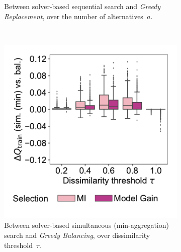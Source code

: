 \documentclass{article}
\theoremstyle{definition}
\begin{document}
\begin{figure}[p]
\begin{subfigure}[t]{0.48\textwidth}
		\caption{
			Between solver-based sequential search and \emph{Greedy Replacement}, over the number of alternatives~$a$.
		}
		\label{fig:afs:impact-search-heuristics-metric-diff-seq-num-alternatives}
	\end{subfigure}
	\\ \vspace{\baselineskip}
	\begin{subfigure}[t]{0.48\textwidth}
		\centering
		\includegraphics[width=\textwidth, trim=15 30 15 15, clip]{plots/afs-impact-search-heuristics-metric-diff-sim-tau.pdf}
		\caption{Between solver-based simultaneous (min-aggregation) search and \emph{Greedy Balancing}, over dissimilarity threshold~$\tau$.}
		\label{fig:afs:impact-search-heuristics-metric-diff-sim-tau}
	\end{subfigure}
	\hfill
	\begin{subfigure}[t]{0.48\textwidth}
		\centering

\end{subfigure}
\end{figure}
\end{document}
